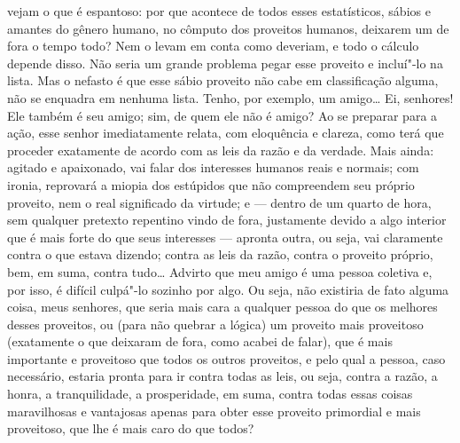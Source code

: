 vejam o que é espantoso: por que acontece de todos esses estatísticos,
sábios e amantes do gênero humano, no cômputo dos proveitos humanos,
deixarem um de fora o tempo todo? Nem o levam em conta como deveriam, e
todo o cálculo depende disso. Não seria um grande problema pegar esse
proveito e incluí"-lo na lista. Mas o nefasto é que esse sábio proveito
não cabe em classificação alguma, não se enquadra em nenhuma lista.
Tenho, por exemplo, um amigo\ldots{} Ei, senhores! Ele também é seu amigo;
sim, de quem ele não é amigo? Ao se preparar para a ação, esse senhor
imediatamente relata, com eloquência e clareza, como terá que proceder
exatamente de acordo com as leis da razão e da verdade. Mais ainda:
agitado e apaixonado, vai falar dos interesses humanos reais e normais;
com ironia, reprovará a miopia dos estúpidos que não compreendem seu
próprio proveito, nem o real significado da virtude; e --- dentro de um
quarto de hora, sem qualquer pretexto repentino vindo de fora,
justamente devido a algo interior que é mais forte do que seus
interesses --- apronta outra, ou seja, vai claramente contra o que estava
dizendo; contra as leis da razão, contra o proveito próprio, bem, em
suma, contra tudo\ldots{} Advirto que meu amigo é uma pessoa coletiva e, por
isso, é difícil culpá"-lo sozinho por algo. Ou seja, não existiria de
fato alguma coisa, meus senhores, que seria mais cara a qualquer pessoa
do que os melhores desses proveitos, ou (para não quebrar a lógica) um
proveito mais proveitoso (exatamente o que deixaram de fora, como acabei
de falar), que é mais importante e proveitoso que todos os outros
proveitos, e pelo qual a pessoa, caso necessário, estaria pronta para ir
contra todas as leis, ou seja, contra a razão, a honra, a tranquilidade,
a prosperidade, em suma, contra todas essas coisas maravilhosas e
vantajosas apenas para obter esse proveito primordial e mais proveitoso,
que lhe é mais caro do que todos?

